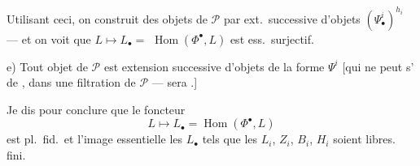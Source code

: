 \documentclass[11pt,a4paper]{article}
\begin{document}
Utilisant ceci, on construit des objets de $\mathcal{P}$ par ext.\ successive d'objets
$(\Psi^i_{\bullet})^{h_i}$ --- et on voit que $L \mapsto L_{\bullet} =$
$\operatorname{Hom}(\Phi^{\bullet}, L)$ est ess.\ surjectif.

e) Tout objet de $\mathcal{P}$ est extension successive
d'objets de la forme $\Psi^i$ [qui ne peut
s' de  , dans
une filtration   de $\mathcal{P}$ ---
 sera  .]

Je dis    
pour conclure que le foncteur
\[
L \longmapsto L_{\bullet} = \operatorname{Hom}(\Phi^{\bullet}, L)
\]
est pl.\ fid.\ et  l'image essentielle les $L_{\bullet}$ tels
que les $L_i$, $Z_i$, $B_i$, $H_i$ soient libres. 
  \struck{\ill{}}   \ill{} \ill{} fini.
\end{document}
